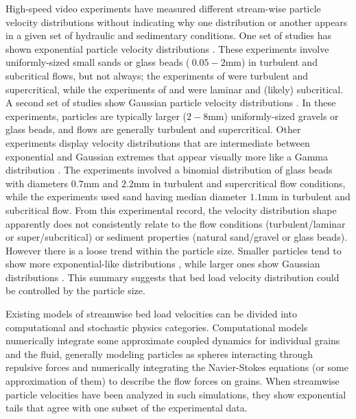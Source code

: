 High-speed video experiments have measured different stream-wise particle velocity distributions without indicating why one distribution or another appears in a given set of hydraulic and sedimentary conditions.
One set of studies has shown exponential particle velocity distributions \citep{Charru2004,Lajeunesse2010,Roseberry2012,Seizilles2014,Fathel2015,Fathel2016}.
These experiments involve uniformly-sized small sands or glass beads ($~0.05-2$mm) in turbulent and subcritical flows, but not always; the experiments of \citet{Lajeunesse2010} were turbulent and supercritical, while the experiments of \citet{Charru2004} and \citet{Seizilles2014} were laminar and (likely) subcritical.
A second set of studies show Gaussian particle velocity distributions \citep{Ancey2014,Heyman2016,Martin2012}. In these experiments, particles are typically larger ($2-8$mm) uniformly-sized gravels or glass beads, and flows are generally turbulent and supercritical.
Other experiments display velocity distributions that are intermediate between exponential and Gaussian extremes that appear visually more like a Gamma distribution \citep{Houssais2012, Liu2019}.
The \citet{Houssais2012} experiments involved a binomial distribution of glass beads with diameters $0.7$mm and $2.2$mm in turbulent and supercritical flow conditions, while the \citet{Liu2019} experiments used sand having median diameter $1.1$mm in turbulent and subcritical flow.
From this experimental record, the velocity distribution shape apparently does not consistently relate to the flow conditions (turbulent/laminar or super/subcritical) or sediment properties (natural sand/gravel or glass beads).
However there is a loose trend within the particle size.
Smaller particles tend to show more exponential-like distributions \citep[e.g.][]{Fathel2015}, while larger ones show Gaussian distributions \citep[e.g.][]{Heyman2016}. This summary suggests that bed load velocity distribution could be controlled by the particle size.

Existing models of streamwise bed load velocities can be divided into computational and stochastic physics categories.
Computational models numerically integrate some approximate coupled dynamics for individual grains and the fluid, generally modeling particles as spheres interacting through repulsive forces and numerically integrating the Navier-Stokes equations (or some approximation of them) to describe the flow forces on grains.
When streamwise particle velocities have been analyzed in such simulations, they show exponential tails \citep{Gonzalez2017,Furbish2013} that agree with one subset of the experimental data.

